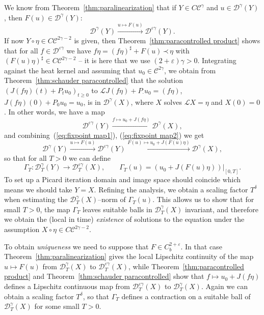 \documentclass[a4paper,11pt]{article}
\newcommand{\cdummy}{\cdot}
\newcommand{\tmtextit}[1]{{\itshape{#1}}}
\newcommand{\LL}{\mathscr{L}}
\newcommand{\CC}{\mathscr{C}}
\newcommand{\CD}{\mathscr{D}}
\newcommand{\lpara}{\,\mathord{\prec}\,}
\newcommand{\reso}{\,\mathord{\circ}\,}
\begin{document}
We know from Theorem~\ref{thm:paralinearization} that if $Y \in C
\CC^{\gamma}$ and $u \in \CD^{\gamma} (Y)$, then $F (u) \in \CD^{\gamma} (Y)$:
\begin{equation}
  \label{eq:fixpoint map1} \CD^{\gamma} (Y) \xrightarrow{u \mapsto F (u)}
  \CD^{\varepsilon \gamma} (Y) .
\end{equation}
If now $Y \reso \eta \in C \CC^{2 \gamma - 2}$ is given, then
Theorem~\ref{thm:paracontrolled product} shows that for all $f \in
\CD^{\varepsilon \gamma}$ we have $f \eta = (f \eta)^{\sharp} + F (u) \lpara
\eta$ with $(F (u) \eta)^{\sharp} \in C \CC^{2 \gamma - 2}$ -- it is here that
we use $(2 + \varepsilon) \gamma > 0$. Integrating against the heat kernel and
assuming that $u_0 \in \CC^{2 \gamma}$, we obtain from
Theorem~\ref{thm:schauder paracontrolled} that the solution $(J (f \eta) (t) +
P_t u_0)_{t \geqslant 0}$ to $\LL J (f \eta) + P_{\cdummy} u_0 = (f \eta)$, $J
(f \eta) (0) + P_0 u_0 = u_0$, is in $\CD^{\gamma} (X)$, where $X$ solves $\LL
X = \eta$ and $X (0) = 0$. In other words, we have a map
\begin{equation}
  \label{eq:fixpoint map2} \CD^{\varepsilon \gamma} (Y) \xrightarrow{f \mapsto
  u_0 + J (f \eta)} \CD^{\gamma} (X),
\end{equation}
and combining~(\ref{eq:fixpoint map1}), (\ref{eq:fixpoint map2}) we get
\[ \CD^{\gamma} (Y) \xrightarrow{u \mapsto F (u)} \CD^{\varepsilon \gamma} (Y)
   \xrightarrow{F (u) \mapsto u_0 + J (F (u) \eta)} \CD^{\gamma} (X), \]
so that for all $T > 0$ we can define
\[ \Gamma_T : \CD_T^{\gamma} (Y) \rightarrow \CD_T^{\varepsilon \gamma} (X),
   \hspace{2em} \Gamma_T (u) = (u_0 + J (F (u) \eta)) |_{[0, T]} . \]
To set up a Picard iteration domain and image space should coincide which
means we should take $Y = X$. Refining the analysis, we obtain a scaling
factor $T^{\delta}$ when estimating the $\CD_T^{\gamma} (X)$--norm of
$\Gamma_T (u)$. This allows us to show that for small $T > 0$, the map
$\Gamma_T$ leaves suitable balls in $\CD^{\gamma}_T (X)$ invariant, and
therefore we obtain the (local in time) \tmtextit{existence} of solutions to
the equation under the assumption $X \reso \eta \in C \CC^{2 \gamma - 2}$.

To obtain \tmtextit{uniqueness} we need to suppose that $F \in C^{2 +
\varepsilon}_b$. In that case Theorem~\ref{thm:paralinearization} gives the
local Lipschitz continuity of the map $u \mapsto F (u)$ from $\CD_T^{\gamma}
(X)$ to $\CD^{\varepsilon \gamma}_T (X)$, while
Theorem~\ref{thm:paracontrolled product} and Theorem~\ref{thm:schauder
paracontrolled} show that $f \mapsto u_0 + J (f \eta)$ defines a Lipschitz
continuous map from $\CD^{\varepsilon \gamma}_T (X)$ to $\CD^{\gamma}_T (X)$.
Again we can obtain a scaling factor $T^{\delta}$, so that $\Gamma_T$ defines
a contraction on a suitable ball of $\CD^{\gamma}_T (X)$ for some small $T >
0$.
\end{document}
